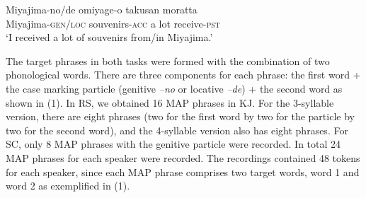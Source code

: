 \documentclass[output=paper]{LSP/langsci}
\begin{document}
\begin{table} 
\caption{Target words in two tasks (RS and SC) and their tones in SJ and KJ.}
\label{tab:3}
\end{table}

\ea
\label{ex:1}
\gll Miyajima-no/de     omiyage-o    takusan   moratta\\
{Miyajima\textsc{{}-gen/loc}}  {souvenirs-\textsc{acc}}   {a lot}  {receive-\textsc{pst}}\\ 
\glt `I received a lot of souvenirs from/in Miyajima.'
\z

The target phrases in both tasks were formed with the combination of two phonological words. There are three components for each phrase: the first word + the case marking particle (genitive \textit{–no} or locative \textit{–de}) + the second word as shown in (1). In RS, we obtained 16 MAP phrases in KJ. For the 3-syllable version, there are eight phrases (two for the first word by two for the particle by two for the second word), and the 4-syllable version also has eight phrases.  For SC, only 8 MAP phrases with the genitive particle were recorded. In total 24 MAP phrases for each speaker were recorded. The recordings contained 48 tokens for each speaker, since each MAP phrase comprises two target words, word 1 and word 2 as exemplified in (1).
\end{document}
